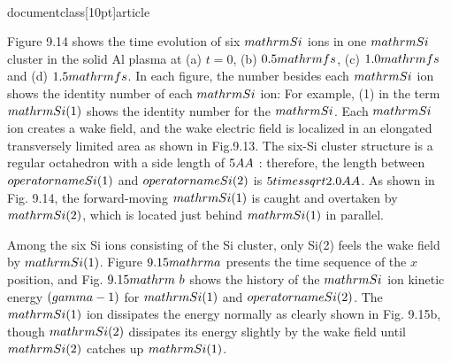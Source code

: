 \\documentclass[10pt]{article}
\begin{document}
{{{{{{Figure 9.14 shows the time evolution of six $\\mathrm{Si}$ ions in one $\\mathrm{Si}$ cluster in the solid Al plasma at (a) $t=0$, (b) $0.5 \\mathrm{fs}$, (c) $1.0 \\mathrm{fs}$ and (d) $1.5 \\mathrm{fs}$. In each figure, the number besides each $\\mathrm{Si}$ ion shows the identity number of each $\\mathrm{Si}$ ion: For example, (1) in the term $\\mathrm{Si}(1)$ shows the identity number for the $\\mathrm{Si}$. Each $\\mathrm{Si}$ ion creates a wake field, and the wake electric field is localized in an elongated transversely limited area as shown in Fig.9.13. The six-Si cluster structure is a regular octahedron with a side length of $5 \\AA$ : therefore, the length between $\\operatorname{Si}(1)$ and $\\operatorname{Si}(2)$ is $5 \\times \\sqrt{2.0} \\AA$. As shown in Fig. 9.14, the forward-moving $\\mathrm{Si}(1)$ is caught and overtaken by $\\mathrm{Si}(2)$, which is located just behind $\\mathrm{Si}(1)$ in parallel.

Among the six Si ions consisting of the Si cluster, only Si(2) feels the wake field by $\\mathrm{Si}(1)$. Figure $9.15 \\mathrm{a}$ presents the time sequence of the $x$ position, and Fig. $9.15 \\mathrm{~b}$ shows the history of the $\\mathrm{Si}$ ion kinetic energy $(\\gamma-1)$ for $\\mathrm{Si}(1)$ and $\\operatorname{Si}(2)$. The $\\mathrm{Si}(1)$ ion dissipates the energy normally as clearly shown in Fig. 9.15b, though $\\mathrm{Si}(2)$ dissipates its energy slightly by the wake field until $\\mathrm{Si}(2)$ catches up $\\mathrm{Si}(1)$.

}}}}}}
\end{document}
